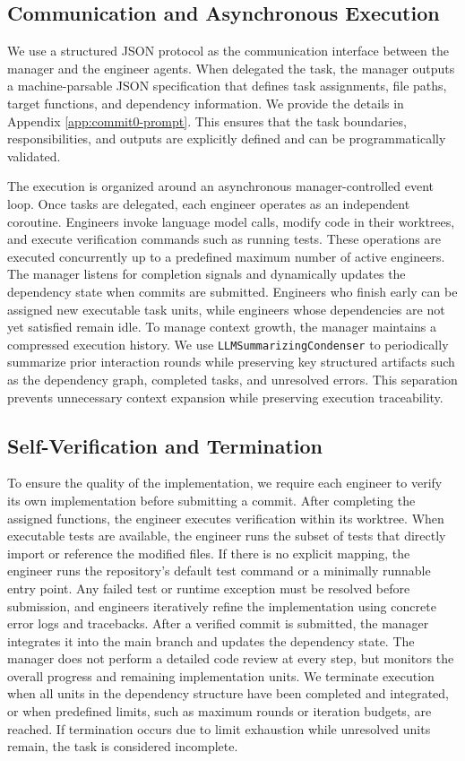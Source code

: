 \subsection{Communication and Asynchronous Execution}
\label{sec:com-async}
We use a structured JSON protocol as the communication interface between the manager and the engineer agents. When delegated the task, the manager outputs a machine-parsable JSON specification that defines task assignments, file paths, target functions, and dependency information. We provide the details in Appendix \ref{app:commit0-prompt}. This ensures that the task boundaries, responsibilities, and outputs are explicitly defined and can be programmatically validated.

The execution is organized around an asynchronous manager-controlled event loop. Once tasks are delegated, each engineer operates as an independent coroutine. Engineers invoke language model calls, modify code in their worktrees, and execute verification commands such as running tests. These operations are executed concurrently up to a predefined maximum number of active engineers. The manager listens for completion signals and dynamically updates the dependency state when commits are submitted. Engineers who finish early can be assigned new executable task units, while engineers whose dependencies are not yet satisfied remain idle. To manage context growth, the manager maintains a compressed execution history. We use \texttt{LLMSummarizingCondenser} to periodically summarize prior interaction rounds while preserving key structured artifacts such as the dependency graph, completed tasks, and unresolved errors. This separation prevents unnecessary context expansion while preserving execution traceability.

\subsection{Self-Verification and Termination}
\label{sec:self-verfication}
To ensure the quality of the implementation, we require each engineer to verify its own implementation before submitting a commit. After completing the assigned functions, the engineer executes verification within its worktree. When executable tests are available, the engineer runs the subset of tests that directly import or reference the modified files. If there is no explicit mapping, the engineer runs the repository’s default test command or a minimally runnable entry point. Any failed test or runtime exception must be resolved before submission, and engineers iteratively refine the implementation using concrete error logs and tracebacks. After a verified commit is submitted, the manager integrates it into the main branch and updates the dependency state. The manager does not perform a detailed code review at every step, but monitors the overall progress and remaining implementation units. We terminate execution when all units in the dependency structure have been completed and integrated, or when predefined limits, such as maximum rounds or iteration budgets, are reached. If termination occurs due to limit exhaustion while unresolved units remain, the task is considered incomplete.

